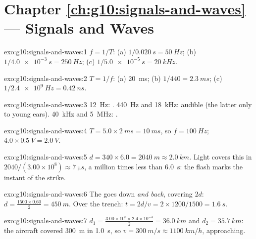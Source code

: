 \section*{Chapter \ref{ch:g10:signals-and-waves} --- Signals and Waves}

\begin{solution}{exo:g10:signals-and-waves:1}
$f = 1/T$: (a) $1/\qty{0.020}{s} = \qty{50}{Hz}$;
(b) $1/\qty{4.0e-3}{s} = \qty{250}{Hz}$;
(c) $1/\qty{5.0e-5}{s} = \qty{20}{kHz}$.
\end{solution}

\begin{solution}{exo:g10:signals-and-waves:2}
$T = 1/f$: (a) \qty{20}{ms}; (b) $1/440 = \qty{2.3}{ms}$;
(c) $1/\qty{2.4e9}{Hz} = \qty{0.42}{ns}$.
\end{solution}

\begin{solution}{exo:g10:signals-and-waves:3}
\qty{12}{Hz}: . \qty{440}{Hz} and \qty{18}{kHz}: audible (the
latter only to young ears). \qty{40}{kHz} and \qty{5}{MHz}: .
\end{solution}

\begin{solution}{exo:g10:signals-and-waves:4}
$T = 5.0 \times \qty{2}{ms} = \qty{10}{ms}$, so $f = \qty{100}{Hz}$;
 $4.0 \times \qty{0.5}{V} = \qty{2.0}{V}$.
\end{solution}

\begin{solution}{exo:g10:signals-and-waves:5}
$d = 340 \times 6.0 = \qty{2040}{m} \approx \qty{2.0}{km}$. Light covers
this in $2040/(3.00\times10^{8}) \approx \qty{7}{\micro s}$, a million
times less than \qty{6.0}{s}: the flash marks the instant of the strike.
\end{solution}

\begin{solution}{exo:g10:signals-and-waves:6}
The  goes down \emph{and back}, covering $2d$:
$d = \frac{1500 \times 0.60}{2} = \qty{450}{m}$. Over the trench:
$t = 2d/v = 2 \times 1200/1500 = \qty{1.6}{s}$.
\end{solution}

\begin{solution}{exo:g10:signals-and-waves:7}
$d_1 = \frac{3.00\times10^{8} \times 2.4\times10^{-4}}{2} =
\qty{36.0}{km}$ and $d_2 = \qty{35.7}{km}$: the aircraft covered
\qty{300}{m} in \qty{1.0}{s}, so $v = \qty{300}{m/s} \approx
\qty{1100}{km/h}$, approaching.
\end{solution}

